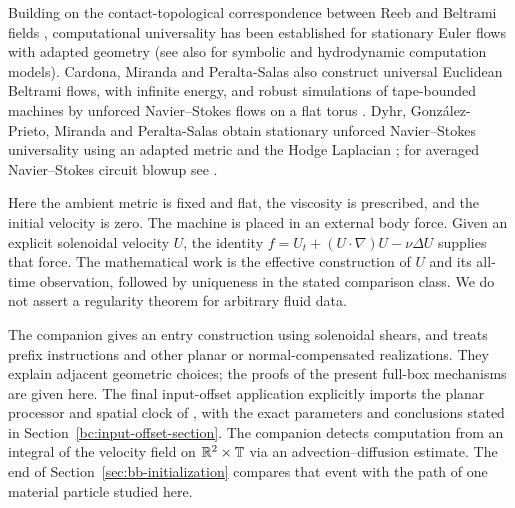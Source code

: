 Building on the contact-topological correspondence between Reeb and
Beltrami fields \cite{EtnyreGhrist2000}, computational universality has
been established for stationary Euler flows with adapted geometry
\cite{CardonaMirandaPeraltaSalasPresas2021,CardonaMirandaPeraltaSalas2022,CardonaMirandaPeraltaSalasPresas2023,CardonaMirandaPeraltaSalas2025FluidComputer}
(see also \cite{Cardona2025Advice} for symbolic and hydrodynamic
computation models).
Cardona, Miranda and Peralta-Salas also construct universal Euclidean
Beltrami flows, with infinite energy, and robust simulations of
tape-bounded machines by unforced Navier--Stokes flows on a flat torus
\cite[arXiv version~3, Theorem~1 and Remark~29]{CardonaMirandaPeraltaSalas2023Beltrami}.
Dyhr, Gonz\'alez-Prieto, Miranda and Peralta-Salas obtain stationary
unforced Navier--Stokes universality using an adapted metric and the
Hodge Laplacian
\cite[Theorem~A]{DyhrGonzalezPrietoMirandaPeraltaSalas2026}; for averaged Navier--Stokes circuit blowup see \cite{Tao2016}.

Here the ambient metric is fixed and flat, the viscosity is
prescribed, and the initial velocity is zero. The machine is placed in an
external body force. Given an explicit solenoidal velocity $U$, the identity
$f=U_t+(U\cdot\nabla)U-\nu\Delta U$ supplies that force. The mathematical
work is the effective construction of $U$ and its all-time observation,
followed by uniqueness in the stated comparison class. We do not assert a
regularity theorem for arbitrary fluid data.

The companion \cite{OpenAI379Shear} gives an entry construction using
solenoidal shears, and \cite{OpenAI379Sheets} treats prefix instructions
and other planar or normal-compensated realizations. They explain adjacent
geometric choices; the proofs of the present full-box mechanisms are given
here. The final input-offset application explicitly imports the planar
processor and spatial clock of \cite{OpenAI379StationaryA2}, with the exact
parameters and conclusions stated in Section~\ref{bc:input-offset-section}.
The companion \cite{OpenAI379EulerianC} detects computation from an
integral of the velocity field on $\mathbb R^2\times\mathbb T$ via an
advection--diffusion estimate. The end of
Section~\ref{sec:bb-initialization} compares that event with the path of
one material particle studied here.

